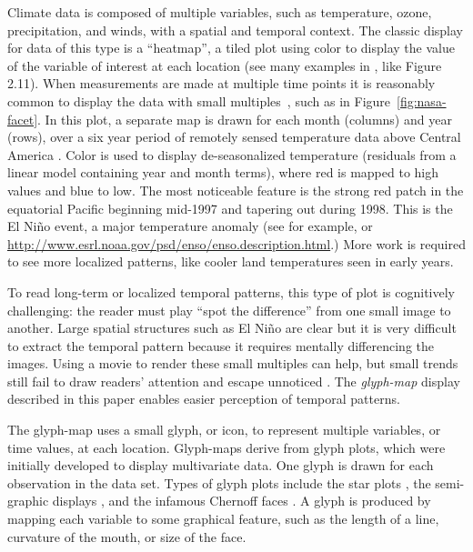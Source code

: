 \documentclass[oneside]{article}
\begin{document}
Climate data is composed of multiple variables, such as temperature, ozone, precipitation, and winds, with a spatial and temporal context. The classic display for data of this type is a ``heatmap'', a tiled plot using color to display the value of the variable of interest at each location (see many examples in \citet{IPCC}, like Figure 2.11). When measurements are made at multiple time points it is reasonably common to display the data with small multiples~\citep{tufte:2001}, such as in Figure~\ref{fig:nasa-facet}. In this plot, a separate map is drawn for each month (columns) and year (rows), over a six year period of remotely sensed temperature data above Central America \citep{murrell:2010}. Color is used to display de-seasonalized temperature (residuals from a linear model containing year and month terms), where red is mapped to high values and blue to low. The most noticeable feature is the strong red patch in the equatorial Pacific beginning mid-1997 and tapering out during 1998. This is the El Ni\~no event, a major temperature anomaly (see for example, \citet{trenberth} or \url{http://www.esrl.noaa.gov/psd/enso/enso.description.html}.) More work is required to see more localized patterns, like cooler land temperatures seen in early years.


To read long-term or localized temporal patterns, this type of plot is cognitively challenging: the reader must play ``spot the difference'' from one small image to another. Large spatial structures such as El Ni\~no are clear but it is very difficult to extract the temporal pattern because it requires mentally differencing the images. Using a movie to render these small multiples can help, but small trends still fail to draw readers' attention and escape unnoticed \citep{simons:gradual}. The \emph{glyph-map} display described in this paper enables easier perception of temporal patterns. 

The glyph-map uses a small glyph, or icon, to represent multiple variables, or time values, at each location. Glyph-maps derive from glyph plots, which were initially developed to display multivariate data. One glyph is drawn for each observation in the data set. Types of glyph plots include the star plots \citep{mayr:1877, FD01, kleiner:1981}, the semi-graphic displays \citep{anderson:1960}, and the infamous Chernoff faces \citep{chernoff:1973}. A glyph is produced by mapping each variable to some graphical feature, such as the length of a line, curvature of the mouth, or size of the face. 
\end{document}
